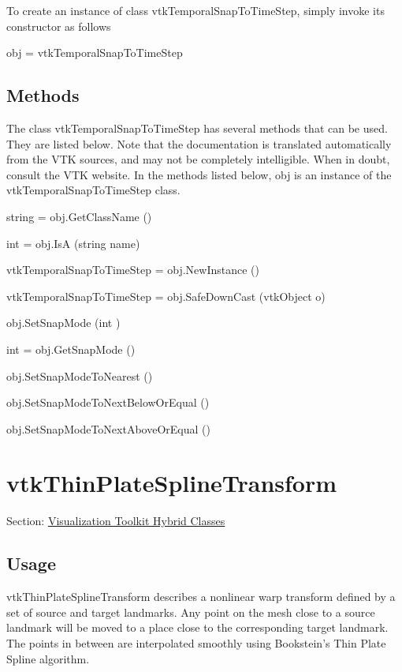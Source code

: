 To create an instance of class vtk\-Temporal\-Snap\-To\-Time\-Step, simply invoke its constructor as follows \begin{DoxyVerb}  obj = vtkTemporalSnapToTimeStep
\end{DoxyVerb}
 \hypertarget{vtkwidgets_vtkxyplotwidget_Methods}{}\subsection{Methods}\label{vtkwidgets_vtkxyplotwidget_Methods}
The class vtk\-Temporal\-Snap\-To\-Time\-Step has several methods that can be used. They are listed below. Note that the documentation is translated automatically from the V\-T\-K sources, and may not be completely intelligible. When in doubt, consult the V\-T\-K website. In the methods listed below, {\ttfamily obj} is an instance of the vtk\-Temporal\-Snap\-To\-Time\-Step class. 
\begin{DoxyItemize}
\item {\ttfamily string = obj.\-Get\-Class\-Name ()}  
\item {\ttfamily int = obj.\-Is\-A (string name)}  
\item {\ttfamily vtk\-Temporal\-Snap\-To\-Time\-Step = obj.\-New\-Instance ()}  
\item {\ttfamily vtk\-Temporal\-Snap\-To\-Time\-Step = obj.\-Safe\-Down\-Cast (vtk\-Object o)}  
\item {\ttfamily obj.\-Set\-Snap\-Mode (int )}  
\item {\ttfamily int = obj.\-Get\-Snap\-Mode ()}  
\item {\ttfamily obj.\-Set\-Snap\-Mode\-To\-Nearest ()}  
\item {\ttfamily obj.\-Set\-Snap\-Mode\-To\-Next\-Below\-Or\-Equal ()}  
\item {\ttfamily obj.\-Set\-Snap\-Mode\-To\-Next\-Above\-Or\-Equal ()}  
\end{DoxyItemize}\hypertarget{vtkhybrid_vtkthinplatesplinetransform}{}\section{vtk\-Thin\-Plate\-Spline\-Transform}\label{vtkhybrid_vtkthinplatesplinetransform}
Section\-: \hyperlink{sec_vtkhybrid}{Visualization Toolkit Hybrid Classes} \hypertarget{vtkwidgets_vtkxyplotwidget_Usage}{}\subsection{Usage}\label{vtkwidgets_vtkxyplotwidget_Usage}
vtk\-Thin\-Plate\-Spline\-Transform describes a nonlinear warp transform defined by a set of source and target landmarks. Any point on the mesh close to a source landmark will be moved to a place close to the corresponding target landmark. The points in between are interpolated smoothly using Bookstein's Thin Plate Spline algorithm.

